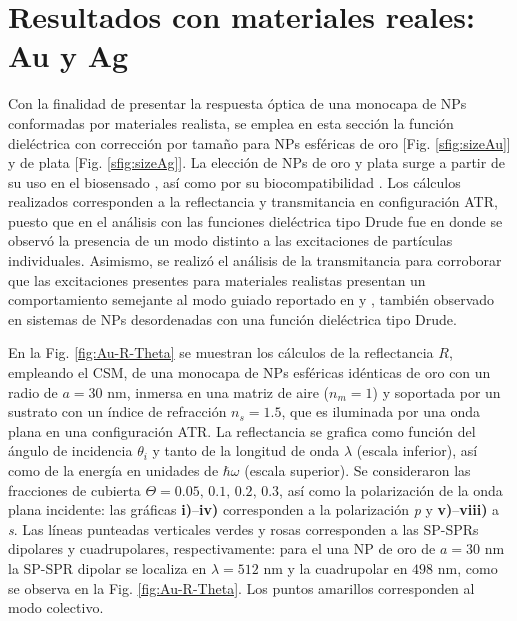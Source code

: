 \section{Resultados con materiales reales: Au y Ag}
\label{section:AuAg}

Con la finalidad de presentar la respuesta óptica de una monocapa de NPs conformadas por materiales realista, se emplea en esta sección la función dieléctrica con corrección por tamaño para NPs esféricas de oro [Fig. \ref{sfig:sizeAu}] y de plata [Fig. \ref{sfig:sizeAg}]. La elección de NPs de oro y plata surge a partir de su uso en el biosensado \cite{jain2008noble}, así como por su biocompatibilidad \cite{fan2009bio,bosetti2002silver}. Los cálculos realizados corresponden a la reflectancia y transmitancia en configuración ATR, puesto que en el análisis con las funciones dieléctrica tipo Drude fue en donde se observó la presencia de un modo distinto a las excitaciones de partículas individuales. Asimismo, se realizó el análisis de la transmitancia para corroborar que las excitaciones presentes para materiales realistas presentan un comportamiento semejante al modo guiado reportado en \cite{kabashin2009plasmonic} y \cite{danilov2018ultra}, también observado en sistemas de NPs desordenadas con una función dieléctrica tipo Drude.

En la Fig.  \ref{fig:Au-R-Theta} se muestran los cálculos de la reflectancia $R$, empleando el CSM, de una monocapa de NPs esféricas idénticas de oro con un radio de $a = 30$ nm, inmersa en una matriz de aire ($n_m = 1$) y soportada por un sustrato con un índice de refracción $n_s = 1.5$, que es iluminada por una onda plana en una configuración ATR. La reflectancia se grafica como función del ángulo de incidencia $\theta_i$ y tanto de la longitud de onda $\lambda$ (escala inferior), así como de la energía en unidades de $\hbar\omega$ (escala superior). Se consideraron las fracciones de cubierta $\Theta = 0.05,\,0.1,\,0.2,\,0.3$, así como la polarización de la onda plana incidente: las gráficas \textbf{i)}--\textbf{iv)} corresponden a la polarización \emph{p} y \textbf{v)}--\textbf{viii)} a \emph{s}. Las líneas punteadas verticales verdes y rosas corresponden a las SP-SPRs dipolares y cuadrupolares, respectivamente: para el una NP de oro de $a= 30$ nm la SP-SPR dipolar se localiza en $\lambda = 512$ nm y la cuadrupolar en $498$ nm, como se observa en la Fig. \ref{fig:Au-R-Theta}. Los puntos amarillos corresponden al modo colectivo.

